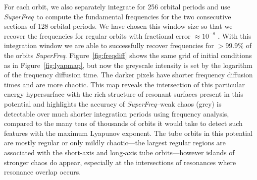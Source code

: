 \documentclass{mn2e}
\newcommand{\project}[1]{\textsl{#1}}
\newcommand{\superfreq}{\project{SuperFreq}}
\begin{document}
For each orbit, we also separately integrate for 256 orbital periods and use \superfreq\ to compute the fundamental frequencies for the two consecutive sections of 128 orbital periods. We have chosen this window size so that we recover the frequencies for regular orbits with fractional error $\approx10^{-8}$ \citep[we estimate the error in frequency recovery using the method described in][]{laskar93}. With this integration window we are able to successfully recover frequencies for $>$99.9\% of the orbits \superfreq. Figure~\ref{fig:freqdiff} shows the same grid of initial conditions as in Figure~\ref{fig:lyapmap}, but now the greyscale intensity is set by the logarithm of the frequency diffusion time. The darker pixels have shorter frequency diffusion times and are more chaotic. This map reveals the intersection of this particular energy hypersurface with the rich structure of resonant surfaces present in this potential and highlights the accuracy of \superfreq\---weak chaos (grey) is detectable over much shorter integration periods using frequency analysis, compared to the many tens of thousands of orbits it would take to detect such features with the maximum Lyapunov exponent. The tube orbits in this potential are mostly regular or only mildly chaotic---the largest regular regions are associated with the short-axis and long-axis tube orbits---however islands of stronger chaos do appear, especially at the intersections of resonances where resonance overlap occurs.
\end{document}
